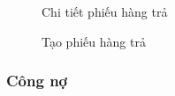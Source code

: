 \begin{figure}[H]
    \begin{center}
        \caption{Chi tiết phiếu hàng trả}
        \label{mockup_detail_return_invoice}
    \end{center}
\end{figure}

\begin{figure}[H]
    \begin{center}
        \caption{Tạo phiếu hàng trả}
        \label{mockup_create_return_invoice_1}
    \end{center}
\end{figure}

\subsubsection{Công nợ}

